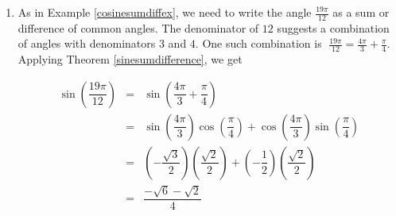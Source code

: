 {\begin{enumerate}

\item  As in  Example \ref{cosinesumdiffex}, we need to write the angle $\frac{19 \pi}{12}$ as a sum or difference of common angles.  The denominator of $12$ suggests a combination of angles with denominators $3$ and $4$.  One such combination is $\; \frac{19 \pi}{12} = \frac{4 \pi}{3} + \frac{\pi}{4}$.  Applying Theorem \ref{sinesumdifference}, we get

\[ \begin{array}{rcl}

\sin\left(\dfrac{19 \pi}{12}\right) & = & \sin\left(\dfrac{4 \pi}{3} + \dfrac{\pi}{4} \right) \\ [10pt]
                            & = & \sin\left(\dfrac{4 \pi}{3} \right)\cos\left(\dfrac{\pi}{4} \right) + \cos\left(\dfrac{4 \pi}{3} \right)\sin\left(\dfrac{\pi}{4} \right) \\ [10pt]
                            & = & \left( -\dfrac{\sqrt{3}}{2} \right)\left( \dfrac{\sqrt{2}}{2} \right)  +  \left( -\dfrac{1}{2} \right)\left( \dfrac{\sqrt{2}}{2} \right) \\ [15pt]
														& = &  \dfrac{-\sqrt{6}- \sqrt{2}}{4} \\
\end{array} \]



\end{enumerate}}
